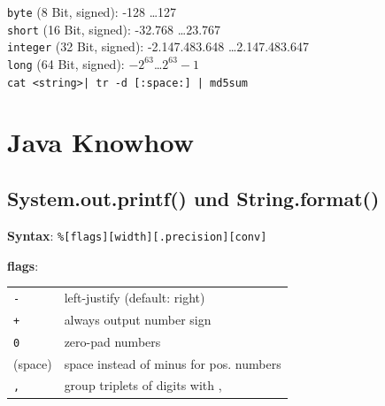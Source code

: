 \documentclass[10pt,a4paper,ngerman,oneside,]{article}
\begin{document}
\vspace{-2mm}
\begin{multicols}{2}
{}

\vspace{1em}
\noindent
\texttt{byte} (8 Bit, signed): -128 \dots 127\\
\texttt{short} (16 Bit, signed): -32.768 \dots 23.767\\
\texttt{integer} (32 Bit, signed): -2.147.483.648 \dots 2.147.483.647\\
\texttt{long} (64 Bit, signed): $-2^{63}$\dots $2^{63}-1$\\

\newcommand{\hash}[1]{{\bfseries MD5:} ~\texttt{#1}}
 \texttt{\small cat <string>| tr -d [:space:] | md5sum}\\

\newpage
\end{multicols}

\section{Java Knowhow}
\subsection{System.out.printf() und String.format()}
\textbf{Syntax}: \texttt{\%[flags][width][.precision][conv]}

\textbf{flags}: \\ \begin{tabular}{ll}
  \texttt{-} & left-justify (default: right) \\
  \texttt{+} & always output number sign \\
  \texttt{0} & zero-pad numbers \\
  (space)    & space instead of minus for pos. numbers \\
  \texttt{,} & group triplets of digits with ,
\end{tabular}
\end{document}
